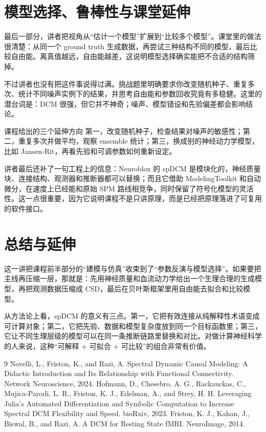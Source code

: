 \documentclass[a4paper]{article}
\begin{document}
\section{模型选择、鲁棒性与课堂延伸}
最后一部分，讲者把视角从“估计一个模型”扩展到“比较多个模型”。课堂里的做法很清楚：从同一个 ground truth 生成数据，再尝试三种结构不同的模型，最后比较自由能。离真值越远，自由能越差，这说明模型选择确实能把不合适的结构筛掉。

不过讲者也没有把这件事说得过满。挑战题里明确要求你改变随机种子、重复多次、统计不同噪声实例下的结果，并思考自由能和参数回收究竟有多稳健。这里的潜台词是：DCM 很强，但它并不神奇；噪声、模型错设和先验偏差都会影响结论。

\begin{importantbox}{课程给出的三个延伸方向}
第一，改变随机种子，检查结果对噪声的敏感性；第二，重复多次并做平均，观察 ensemble 统计；第三，换成别的神经动力学模型，比如 Jansen-Rit，再看先验和可调参数如何重新设定。
\end{importantbox}

讲者最后还补了一句工程上的信息：Neuroblox 的 spDCM 是模块化的，神经质量块、连接结构、观测器和推断器都可以替换；而且它借助 ModelingToolkit 和自动微分，在速度上已经能和原始 SPM 路线相竞争，同时保留了符号化模型的灵活性。这一点很重要，因为它说明课程不是只讲原理，而是已经把原理落进了可复用的软件接口。

\section{总结与延伸}
这一讲把课程前半部分的“建模与仿真”收束到了“参数反演与模型选择”。如果要把主线再压缩一层，那就是：先用神经质量和血流动力学给出一个生理合理的生成模型，再把观测数据压缩成 CSD，最后在贝叶斯框架里用自由能去拟合和比较模型。

从方法论上看，spDCM 的意义有三点。第一，它把有效连接从纯解释性术语变成可计算对象；第二，它把先验、数据和模型复杂度放到同一个目标函数里；第三，它让不同生理层级的模型可以在同一条推断链路里替换和对比。对做计算神经科学的人来说，这种“可解释 + 可拟合 + 可比较”的组合非常有价值。

\begin{thebibliography}{9}
 Novelli, L., Friston, K., and Razi, A. Spectral Dynamic Causal Modeling: A Didactic Introduction and Its Relationship with Functional Connectivity. Network Neuroscience, 2024.
 Hofmann, D., Chesebro, A. G., Rackauckas, C., Mujica-Parodi, L. R., Friston, K. J., Edelman, A., and Strey, H. H. Leveraging Julia's Automated Differentiation and Symbolic Computation to Increase Spectral DCM Flexibility and Speed. bioRxiv, 2023.
 Friston, K. J., Kahan, J., Biswal, B., and Razi, A. A DCM for Resting State fMRI. NeuroImage, 2014.
\end{thebibliography}
\end{document}
